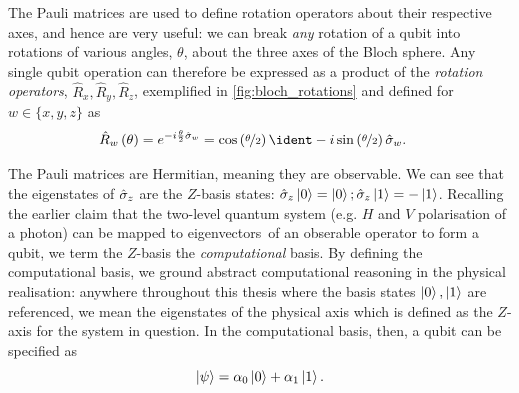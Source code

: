 The Pauli matrices are used to define rotation operators about 
    their respective axes, and hence are very useful:
    we can break \emph{any} rotation of a qubit into rotations of various angles, $\theta$, about the three axes of the Bloch sphere.
Any single qubit operation can therefore be expressed as a product of
    the \emph{rotation operators}, $\hat{R}_x, \hat{R}_y, \hat{R}_z$, exemplified in \cref{fig:bloch_rotations} and defined for $w \in \{ x,y,z\}$ as
\begin{equation}
    \label{eqn:rotation_operator}
    \begin{split}
        \hat{R}_w\left(\theta\right) &= e^{-i \frac{\theta}{2} \hat{\sigma}_w} 
        = \cos\left(\nicefrac{\theta}{2}\right) \ident - i \sin \left(\nicefrac{\theta}{2}\right) \hat{\sigma}_w.
    \end{split}
\end{equation}
    
\par
The Pauli matrices are Hermitian, meaning they are observable. 
We can see that the eigenstates of $\hat{\sigma}_{z}$ are the $Z$-basis states:
    $\hat{\sigma}_{z} \ket{0} = \ket{0}; \hat{\sigma}_{z} \ket{1} = - \ket{1}$.
Recalling the earlier claim that the two-level quantum system (e.g. $H$ and $V$ polarisation of a photon)
    can be mapped to eigenvectors\footnotemark \ of an obserable operator to form a qubit, 
    we term the $Z$-basis the \emph{computational} basis.
By defining the computational basis, we ground abstract computational reasoning in the physical realisation:
    anywhere throughout this thesis where the basis states $\ket{0}, \ket{1}$ are referenced, 
    we mean the eigenstates of the physical axis which is defined as the $Z$-axis for the system in question. 
In the computational basis, then, a qubit can be specified as
\begin{equation}
    \label{eqn:computational_qubit}
    \ket{\psi} = \alpha_0 \ket{0} + \alpha_1 \ket{1}.
\end{equation}

